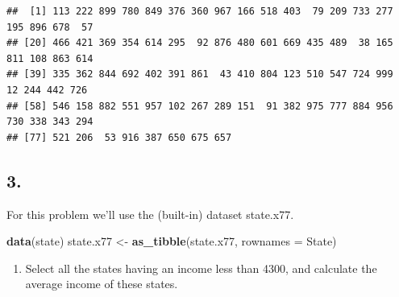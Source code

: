 \documentclass[
]{article}
\newenvironment{Shaded}{\begin{snugshade}}{\end{snugshade}}
\newcommand{\AttributeTok}[1]{\textcolor[rgb]{0.13,0.29,0.53}{#1}}
\newcommand{\DecValTok}[1]{\textcolor[rgb]{0.00,0.00,0.81}{#1}}
\newcommand{\FunctionTok}[1]{\textcolor[rgb]{0.13,0.29,0.53}{\textbf{#1}}}
\newcommand{\NormalTok}[1]{#1}
\newcommand{\OtherTok}[1]{\textcolor[rgb]{0.56,0.35,0.01}{#1}}
\newcommand{\SpecialCharTok}[1]{\textcolor[rgb]{0.81,0.36,0.00}{\textbf{#1}}}
\newcommand{\StringTok}[1]{\textcolor[rgb]{0.31,0.60,0.02}{#1}}
\providecommand{\tightlist}{%
  \setlength{\itemsep}{0pt}\setlength{\parskip}{0pt}}
\begin{document}
\begin{verbatim}
##  [1] 113 222 899 780 849 376 360 967 166 518 403  79 209 733 277 195 896 678  57
## [20] 466 421 369 354 614 295  92 876 480 601 669 435 489  38 165 811 108 863 614
## [39] 335 362 844 692 402 391 861  43 410 804 123 510 547 724 999  12 244 442 726
## [58] 546 158 882 551 957 102 267 289 151  91 382 975 777 884 956 730 338 343 294
## [77] 521 206  53 916 387 650 675 657
\end{verbatim}

\subsection{3.}\label{section-2}

For this problem we'll use the (built-in) dataset state.x77.

\begin{Shaded}
\begin{Highlighting}[]
\FunctionTok{data}\NormalTok{(state)}
\NormalTok{state.x77 }\OtherTok{\textless{}{-}} \FunctionTok{as\_tibble}\NormalTok{(state.x77, }\AttributeTok{rownames  =} \StringTok{\textquotesingle{}State\textquotesingle{}}\NormalTok{)}
\end{Highlighting}
\end{Shaded}

\begin{enumerate}
\def\labelenumi{\alph{enumi}.}
\tightlist
\item
  Select all the states having an income less than 4300, and calculate
  the average income of these states.
\end{enumerate}

\begin{Shaded}
\end{Shaded}
\end{document}
